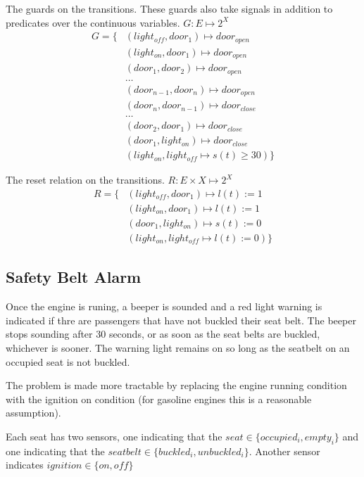 \documentclass{article}
\begin{document}
The guards on the transitions.
These guards also take signals in addition to
predicates over the continuous variables.
$G: E \mapsto 2^X$
\begin{align}
G = \{ & ( light_{off}, door_1 ) \mapsto door_{open} \\
    & ( light_{on}, door_1 ) \mapsto door_{open} \\
    & ( door_1, door_2 ) \mapsto door_{open} \\
    & \ldots \\
    & ( door_{n-1}, door_n ) \mapsto door_{open} \\
    & ( door_n, door_{n-1} ) \mapsto door_{close} \\
    & \ldots \\
    & ( door_2, door_1 ) \mapsto door_{close} \\
    & ( door_1, light_{on} ) \mapsto door_{close} \\
    & ( light_{on}, light_{off} \mapsto s(t) \geq 30 ) \}
\end{align}

The reset relation on the transitions.
$R: E \times X \mapsto 2^X$
\begin{align}
R = \{ & ( light_{off}, door_1 ) \mapsto l(t) := 1 \\
    & ( light_{on}, door_1 ) \mapsto  l(t) := 1 \\
    & ( door_1, light_{on} ) \mapsto s(t) := 0 \\
    & ( light_{on}, light_{off} \mapsto l(t) := 0 ) \}
\end{align}

\subsection{Safety Belt Alarm}
Once the engine is runing,
a beeper is sounded and
a red light warning is indicated if thre are
passengers that have not buckled their seat belt.
The beeper stops sounding after 30 seconds, or
as soon as the seat belts are buckled,
whichever is sooner.
The warning light remains on so long as the
seatbelt on an occupied seat is not buckled.

The problem is made more tractable by
replacing the engine running condition with
the ignition on condition (for gasoline engines
this is a reasonable assumption).

Each seat has two sensors, one indicating that
the $seat \in \{occupied_i ,empty_i\}$
and one indicating that the
$seatbelt \in \{buckled_i, unbuckled_i\}$.
Another sensor indicates
$ignition \in \{on, off\}$
\end{document}
